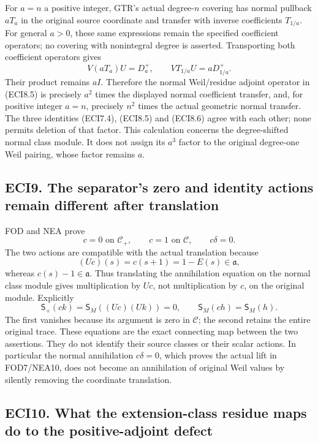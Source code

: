 For \(a=n\) a positive integer, GTR's actual degree-\(n\) covering has
normal pullback \(aT_a\) in the original source coordinate and transfer
with inverse coefficients \(T_{1/a}\). For general \(a>0\), these same
expressions remain the specified coefficient operators; no covering with
nonintegral degree is asserted. Transporting both coefficient operators
gives \[
V(aT_a)U=D_a^+,
\qquad V T_{1/a}U=aD_{1/a}^+.
\tag{ECI8.6}
\] Their product remains \(aI\). Therefore the normal Weil/residue
adjoint operator in (ECI8.5) is precisely \(a^2\) times the displayed
normal coefficient transfer, and, for positive integer \(a=n\),
precisely \(n^2\) times the actual geometric normal transfer. The three
identities (ECI7.4), (ECI8.5) and (ECI8.6) agree with each other; none
permits deletion of that factor. This calculation concerns the
degree-shifted normal class module. It does not assign its \(a^3\)
factor to the original degree-one Weil pairing, whose factor remains
\(a\).

\subsection{ECI9. The separator's zero and identity actions remain
different after
translation}\label{eci9.-the-separators-zero-and-identity-actions-remain-different-after-translation}

FOD and NEA prove \[
c=0\text{ on }\mathscr C_+,
\qquad c=1\text{ on }\mathscr C,
\qquad c\delta=0.
\tag{ECI9.1}
\] The two actions are compatible with the actual translation because \[
(Uc)(s)=c(s+1)=1-E(s)\in\mathfrak a,
\tag{ECI9.2}
\] whereas \(c(s)-1\in\mathfrak a\). Thus translating the annihilation
equation on the normal class module gives multiplication by \(Uc\), not
multiplication by \(c\), on the original module. Explicitly \[
\mathsf S_+(ck)=\mathsf S_M((Uc)(Uk))=0,
\qquad
\mathsf S_M(ch)=\mathsf S_M(h).
\tag{ECI9.3}
\] The first vanishes because its argument is zero in \(\mathscr C\);
the second retains the entire original trace. These equations are the
exact connecting map between the two assertions. They do not identify
their source classes or their scalar actions. In particular the normal
annihilation \(c\delta=0\), which proves the actual lift in FOD7/NEA10,
does not become an annihilation of original Weil values by silently
removing the coordinate translation.

\subsection{ECI10. What the extension-class residue maps do to the
positive-adjoint
defect}\label{eci10.-what-the-extension-class-residue-maps-do-to-the-positive-adjoint-defect}

